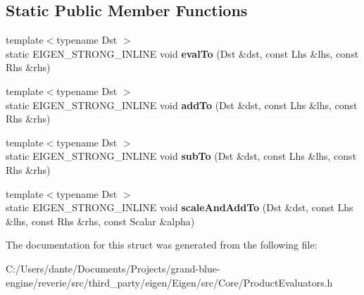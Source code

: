 \subsection*{Static Public Member Functions}
\begin{DoxyCompactItemize}
\item 
\mbox{\label{struct_eigen_1_1internal_1_1generic__product__impl__base_a40bba8fa62c77f319ea8b5880a8a9199}} 
{\footnotesize template$<$typename Dst $>$ }\\static E\+I\+G\+E\+N\+\_\+\+S\+T\+R\+O\+N\+G\+\_\+\+I\+N\+L\+I\+NE void {\bfseries eval\+To} (Dst \&dst, const Lhs \&lhs, const Rhs \&rhs)
\item 
\mbox{\label{struct_eigen_1_1internal_1_1generic__product__impl__base_ab7918338c4d9526139bc891a96ee9ae0}} 
{\footnotesize template$<$typename Dst $>$ }\\static E\+I\+G\+E\+N\+\_\+\+S\+T\+R\+O\+N\+G\+\_\+\+I\+N\+L\+I\+NE void {\bfseries add\+To} (Dst \&dst, const Lhs \&lhs, const Rhs \&rhs)
\item 
\mbox{\label{struct_eigen_1_1internal_1_1generic__product__impl__base_a30e06eff6da25a65944a59070271174c}} 
{\footnotesize template$<$typename Dst $>$ }\\static E\+I\+G\+E\+N\+\_\+\+S\+T\+R\+O\+N\+G\+\_\+\+I\+N\+L\+I\+NE void {\bfseries sub\+To} (Dst \&dst, const Lhs \&lhs, const Rhs \&rhs)
\item 
\mbox{\label{struct_eigen_1_1internal_1_1generic__product__impl__base_a7312930df275f11db3fc4388c3e1819e}} 
{\footnotesize template$<$typename Dst $>$ }\\static E\+I\+G\+E\+N\+\_\+\+S\+T\+R\+O\+N\+G\+\_\+\+I\+N\+L\+I\+NE void {\bfseries scale\+And\+Add\+To} (Dst \&dst, const Lhs \&lhs, const Rhs \&rhs, const Scalar \&alpha)
\end{DoxyCompactItemize}


The documentation for this struct was generated from the following file\+:\begin{DoxyCompactItemize}
\item 
C\+:/\+Users/dante/\+Documents/\+Projects/grand-\/blue-\/engine/reverie/src/third\+\_\+party/eigen/\+Eigen/src/\+Core/Product\+Evaluators.\+h\end{DoxyCompactItemize}
